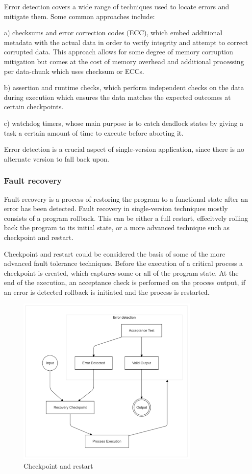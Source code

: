 Error detection covers a wide range of techniques used to locate errors and mitigate them. Some common approaches include:

a) checksums and error correction codes (ECC), which embed additional metadata with the actual data in order to verify integrity and attempt to correct corrupted data. This approach allows for some degree of memory corruption mitigation but comes at the cost of memory overhead and additional processing per data-chunk which uses checksum or ECCs.

b) assertion and runtime checks, which perform independent checks on the data during execution which ensures the data matches the expected outcomes at certain checkpoints.

c) watchdog timers, whose main purpose is to catch deadlock states by giving a task a certain amount of time to execute before aborting it.

Error detection is a crucial aspect of single-version application, since there is no alternate version to fall back upon.

\subsubsection{Fault recovery}

Fault recovery is a process of restoring the program to a functional state after an error has been detected. Fault recovery in single-version techniques mostly consists of a program rollback. This can be either a full restart, effecitvely rolling back the program to its initial state, or a more advanced technique such as checkpoint and restart.

Checkpoint and restart could be considered the basis of some of the more advanced fault tolerance techniques. Before the execution of a critical process a checkpoint is created, which captures some or all of the program state. At the end of the execution, an acceptance check is performed on the process output, if an error is detected rollback is initiated and the process is restarted.

\begin{figure}[hbt]
    \centering
    \includegraphics[width=0.8\textwidth]{diagrams/checkpoint/checkpoint.png}
    \caption{Checkpoint and restart}
    \label{fig:checkpoint}
\end{figure}

